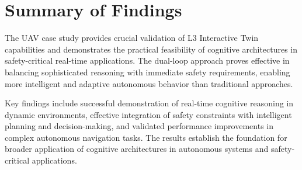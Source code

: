 \section{Summary of Findings}

The UAV case study provides crucial validation of L3 Interactive Twin capabilities and demonstrates the practical feasibility of cognitive architectures in safety-critical real-time applications. The dual-loop approach proves effective in balancing sophisticated reasoning with immediate safety requirements, enabling more intelligent and adaptive autonomous behavior than traditional approaches.

Key findings include successful demonstration of real-time cognitive reasoning in dynamic environments, effective integration of safety constraints with intelligent planning and decision-making, and validated performance improvements in complex autonomous navigation tasks. The results establish the foundation for broader application of cognitive architectures in autonomous systems and safety-critical applications. 